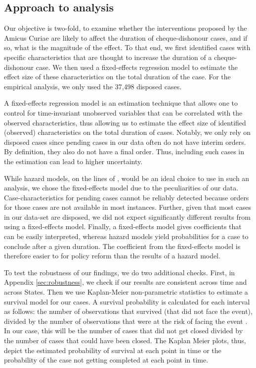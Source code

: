 \subsection{Approach to analysis} \label{sec:approach-analysis}

Our objective is two-fold, to examine whether the interventions proposed by the Amicus Curiae are likely to affect the duration of cheque-dishonour cases, and if so, what is the magnitude of the effect. To that end, we first identified cases with specific characteristics that are thought to increase the duration of a cheque-dishonour case. We then used a fixed-effects regression model to estimate the effect size of these characteristics on the total duration of the case. For the empirical analysis, we only used the 37,498 disposed cases.

A fixed-effects regression model is an estimation technique that allows one to control for time-invariant unobserved variables that can be correlated with the observed characteristics, thus allowing us to estimate the effect size of identified (observed) characteristics on the total duration of cases. Notably, we only rely on disposed cases since pending cases in our data often do not have interim orders. By definition, they also do not have a final order. Thus, including such cases in the estimation can lead to higher uncertainty.

While hazard models, on the lines of \textcite{datta2017_itatDelays}, would be an ideal choice to use in such an analysis, we chose the fixed-effects model due to the peculiarities of our data. Case-characteristics for pending cases cannot be reliably detected because orders for those cases are not available in most instances. Further, given that most cases in our data-set are disposed, we did not expect significantly different results from using a fixed-effects model. Finally, a fixed-effects model gives coefficients that can be easily interpreted, whereas hazard models yield probabilities for a case to conclude after a given duration. The coefficient from the fixed-effects model is therefore easier to for policy reform than the results of a hazard model.

To test the robustness of our findings, we do two additional checks. First, in Appendix \ref{sec:robustness}, we check if our results are consistent across time and across States. Then we use Kaplan-Meier non-parametric statistics to estimate a survival model for our cases. A survival probability is calculated for each interval as follows: the number of observations that survived (that did not face the event), divided by the number of observations that were at the risk of facing the event \autocite{rich2010practical}. In our case, this will be the number of cases that did not get closed divided by the number of cases that could have been closed. The Kaplan Meier plots, thus, depict the estimated probability of survival at each point in time or the probability of the case not getting completed at each point in time.

